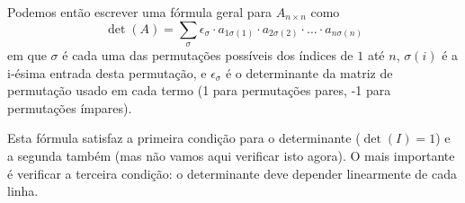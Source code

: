 Podemos então escrever uma fórmula geral para $A_{n\times n}$ como
\begin{equation}\label{eq:cofatores}
   \det(A) = \sum_{\sigma} \epsilon_{\sigma} \cdot a_{1\sigma(1)} \cdot a_{2\sigma(2)} \cdot \ldots \cdot a_{n\sigma(n)}
\end{equation}
em que $\sigma$ é cada uma das permutações possíveis dos índices de $1$ até $n$, $\sigma(i)$ é a i-ésima entrada desta permutação, e $\epsilon_{\sigma}$ é o determinante da matriz de permutação usado em cada termo (1 para permutações pares, -1 para permutações ímpares).

Esta fórmula satisfaz a primeira condição para o determinante ($\det(I)=1$) e a segunda também (mas não vamos aqui verificar isto agora). O mais importante é verificar a terceira condição: o determinante deve depender linearmente de cada linha.

